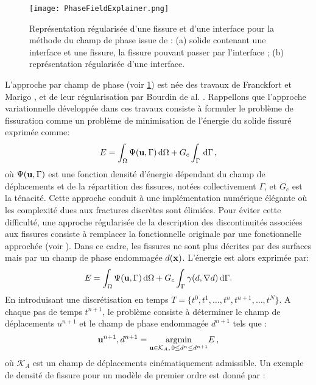 \begin{figure}[!h]
    \centering
    \texttt{[image: PhaseFieldExplainer.png]}
    \caption{Représentation régularisée d’une fissure et d’une interface pour la méthode du champ de phase issue de \parencite{yvonnet2018fissuration}: (a) solide contenant une interface et une fissure, la fissure pouvant passer par l’interface ; (b) représentation régularisée d’une interface.}
    \label{fig:phasefielexplainer}
\end{figure}

L'approche par champ de phase (voir \cref{fig:phasefielexplainer}) est née des travaux de Franckfort et Marigo \parencite{francfort1998revisiting}, et de leur régularisation par Bourdin de al. \parencite{bourdin2008variational}. Rappellons que l’approche variationnelle développée dans ces travaux consiste à formuler le problème de fissuration comme un problème de minimisation de l’énergie du solide fissuré exprimée comme:
\begin{align}
    E = \int_{\Omega} \Psi(\bvec{u},\Gamma) \diff\Omega + G_c\int_{\Gamma} \diff \Gamma \,,
\end{align}
où $\Psi(\bm{\mathrm{u}},\Gamma)$ est une fonction densité d’énergie dépendant du champ de déplacements et de la répartition des
fissures, notées collectivement $\Gamma$, et $G_c$ est la ténacité. Cette approche conduit à une implémentation numérique élégante où les complexité dues aux fractures discrètes sont élimiées. Pour éviter cette difficulté, une approche régularisée de la description
des discontinuités associées aux fissures consiste à remplacer la fonctionnelle originale par une fonctionnelle approchée (voir \parencite{yvonnet2018fissuration}). Dans ce cadre, les fissures ne sont plus décrites par des surfaces mais par un champ de phase endommagée $d(\bm{\mathrm{x}})$. L’énergie est alors exprimée par:
\begin{align}
    E = \int_{\Omega} \Psi(\bvec{u},\Gamma) \diff\Omega + G_c\int_{\Gamma} \gamma(d, \nabla d) \diff \Gamma .
\end{align}
En introduisant une discrétisation en temps $T = \{ t^0, t^1, \ldots, t^n, t^{n+1}, \ldots, t^N \}$. A chaque pas de temps $t^{n+1}$, le problème consiste à déterminer le champ de déplacements $u^{n+1}$ et le champ de phase endommagée $d^{n+1}$ tels que :
\begin{align}
    \bm{\mathrm{u}}^{n+1}, d^{n+1} = \underset{\bm{\mathrm{u}}\in \mathcal{K}_A , \,  0 \leq d^n \leq d^{n+1}}{\text{argmin}} E \,,
\end{align}
où $\mathcal{K}_A$ est un champ de déplacements cinématiquement admissible. Un exemple de densité de fissure pour un modèle de premier ordre est donné par :
